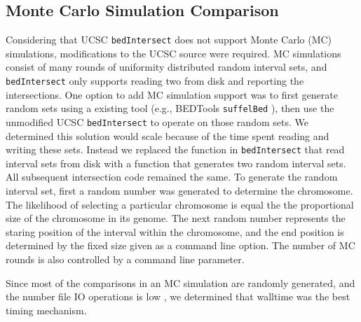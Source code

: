 \subsection{Monte Carlo Simulation Comparison}
Considering that UCSC {\tt bedIntersect} does not support Monte Carlo (MC)
simulations, modifications to the UCSC source were required.  MC simulations
consist of many rounds of uniformity distributed random interval sets, and
{\tt bedIntersect} only supports reading two from disk and reporting the
intersections.  One option to add MC simulation support was to first generate
random sets using a existing tool (e.g., BEDTools {\tt suffelBed} ), then use
the unmodified UCSC {\tt bedIntersect} to operate on those random sets.  We
determined this solution would scale because of the time spent reading and
writing these sets.  Instead we replaced the function in {\tt bedIntersect} that
read interval sets from disk with a function that generates two random interval
sets.  All subsequent intersection code remained the same.  To generate the
random interval set, first a random number was generated to determine the
chromosome.  The likelihood of selecting a particular chromosome is equal the
the proportional size of the chromosome in its genome.  The next random number
represents the staring position of the interval within the chromosome, and the
end position is determined by the fixed size given as a command line option.
The number of MC rounds is also controlled by a command line parameter.

Since most of the comparisons in an MC simulation are randomly generated, and
the number file IO operations is low , we determined that walltime was the
best timing mechanism.
